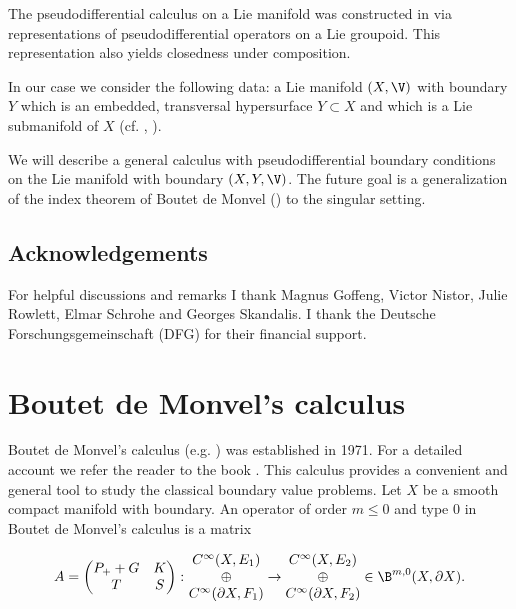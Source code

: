\documentclass[10pt, reqno]{amsart}
\theoremstyle{definition}
\begin{document}
The pseudodifferential calculus on a Lie manifold was constructed in \cite{ALN} via representations of pseudodifferential operators
on a Lie groupoid. This representation also yields closedness under composition.

In our case we consider the following data: a Lie manifold $(X, \V)$ with boundary $Y$ which is an embedded, transversal hypersurface $Y \subset X$ 
and which is a Lie submanifold of $X$ (cf. \cite{ALN}, \cite{AIN}). 

We will describe a general calculus with pseudodifferential boundary conditions on the Lie manifold with boundary $(X, Y, \V)$. 
The future goal is a generalization of the index theorem of Boutet de Monvel (\cite{BM}) to the singular setting.

\subsection*{Acknowledgements}

For helpful discussions and remarks I thank Magnus Goffeng, Victor Nistor, Julie Rowlett, Elmar Schrohe and Georges Skandalis. 
I thank the Deutsche Forschungsgemeinschaft (DFG) for their financial support.

\section{Boutet de Monvel's calculus}

Boutet de Monvel's calculus (e.g. \cite{BM}) was established in 1971. For a detailed account we refer the reader to the book \cite{G}. 
This calculus provides a convenient and general tool to study the classical boundary value problems.
Let $X$ be a smooth compact manifold with boundary. 
An operator of order $m \leq 0$ and type $0$ in Boutet de Monvel's calculus is a matrix

\[
A = \begin{pmatrix} P_{+} + G & K \\
T & S \end{pmatrix} \colon \begin{matrix} C^{\infty}(X, E_1) \\ \oplus \\ C^{\infty}(\partial X, F_1) \end{matrix} \to \begin{matrix} C^{\infty}(X, E_2) \\ \oplus \\ C^{\infty}(\partial X, F_2) \end{matrix} \in \B^{m,0}(X, \partial X).
\]
\end{document}
